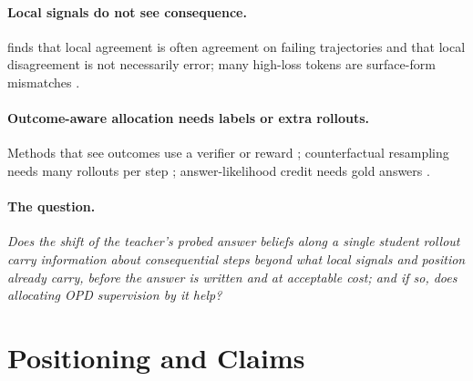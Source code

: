 \documentclass[11pt]{article}
\theoremstyle{definition}
\theoremstyle{remark}
\begin{document}
\paragraph{Local signals do not see consequence.}
\citet{ma2026outcome} finds that local agreement is often agreement on failing trajectories and that local disagreement is not necessarily error; many high-loss tokens are surface-form mismatches \citep{jiang2026topd,he2026cscr}.

\paragraph{Outcome-aware allocation needs labels or extra rollouts.}
Methods that see outcomes use a verifier or reward \citep{r2opd2026,aopd2026,raopd2026,qu2026spot,jiang2026recoverability}; counterfactual resampling needs many rollouts per step \citep{bogdan2025thought}; answer-likelihood credit needs gold answers \citep{wang2026stepwise,ton2025information,alerd2026,li2026decoupled}.

\paragraph{The question.}
\emph{Does the shift of the teacher's probed answer beliefs along a single student rollout carry information about consequential steps beyond what local signals and position already carry, before the answer is written and at acceptable cost; and if so, does allocating OPD supervision by it help?}

\section{Positioning and Claims}
\label{sec:positioning}
\end{document}
